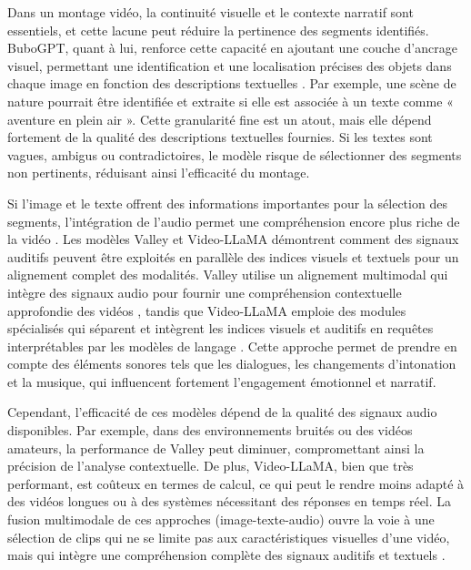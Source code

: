\documentclass[livre]{udes-genie-these}
\begin{document}
Dans un montage vidéo, la continuité visuelle et le contexte narratif sont essentiels, et cette lacune peut réduire la pertinence des segments identifiés. BuboGPT, quant à lui, renforce cette capacité en ajoutant une couche d’ancrage visuel, permettant une identification et une localisation précises des objets dans chaque image en fonction des descriptions textuelles \cite{feng2023}\cite{munasinghe2023_pgvideo}. Par exemple, une scène de nature pourrait être identifiée et extraite si elle est associée à un texte comme « aventure en plein air ». Cette granularité fine est un atout, mais elle dépend fortement de la qualité des descriptions textuelles fournies. Si les textes sont vagues, ambigus ou contradictoires, le modèle risque de sélectionner des segments non pertinents, réduisant ainsi l’efficacité du montage. 

Si l’image et le texte offrent des informations importantes pour la sélection des segments, l’intégration de l’audio permet une compréhension encore plus riche de la vidéo \cite{anonymous2023_videollama}\cite{han2024_clip}. Les modèles Valley \cite{anonymous2023_valley} et Video-LLaMA \cite{anonymous2023_videollama} démontrent comment des signaux auditifs peuvent être exploités en parallèle des indices visuels et textuels pour un alignement complet des modalités. Valley utilise un alignement multimodal qui intègre des signaux audio pour fournir une compréhension contextuelle approfondie des vidéos \cite{huang2024_vtimellm}, tandis que Video-LLaMA emploie des modules spécialisés qui séparent et intègrent les indices visuels et auditifs en requêtes interprétables par les modèles de langage \cite{xu2024}. Cette approche permet de prendre en compte des éléments sonores tels que les dialogues, les changements d’intonation et la musique, qui influencent fortement l’engagement émotionnel et narratif. 

Cependant, l’efficacité de ces modèles dépend de la qualité des signaux audio disponibles. Par exemple, dans des environnements bruités ou des vidéos amateurs, la performance de Valley peut diminuer, compromettant ainsi la précision de l’analyse contextuelle. De plus, Video-LLaMA, bien que très performant, est coûteux en termes de calcul, ce qui peut le rendre moins adapté à des vidéos longues ou à des systèmes nécessitant des réponses en temps réel. La fusion multimodale de ces approches (image-texte-audio) ouvre la voie à une sélection de clips qui ne se limite pas aux caractéristiques visuelles d’une vidéo, mais qui intègre une compréhension complète des signaux auditifs et textuels \cite{wang2024_hawkeye}\cite{anonymous2017_localizing}. 
\end{document}
